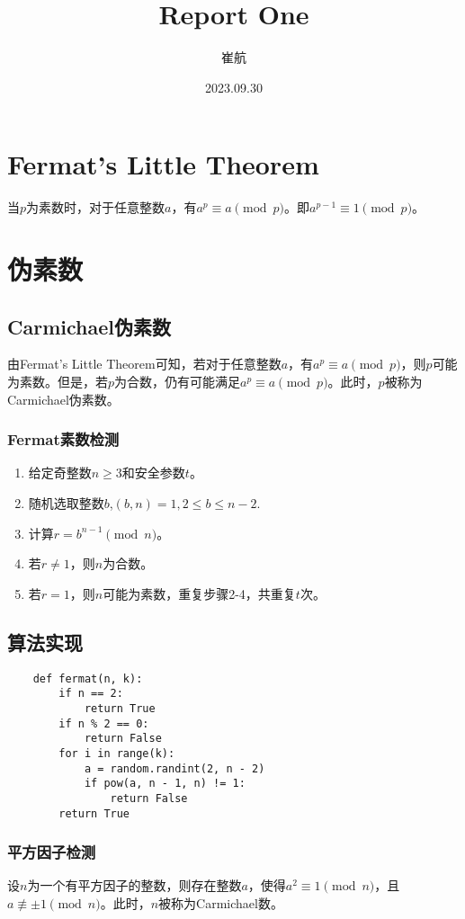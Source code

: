 \documentclass[a4paper]{article}
\title{\heiti\zihao{3} Report One}
\author{\songti 崔航}
\date{2023.09.30}
\begin{document}
    \maketitle
\begin{abstract}
    \lipsum[2]
\end{abstract}
\tableofcontents
\section{Fermat's Little Theorem}
当$p$为素数时，对于任意整数$a$，有$a^p\equiv a\pmod p$。即$a^{p-1}\equiv1\pmod p$。
\section{伪素数}
\subsection{Carmichael伪素数}
由Fermat's Little Theorem可知，若对于任意整数$a$，有$a^p\equiv a\pmod p$，则$p$可能为素数。但是，若$p$为合数，仍有可能满足$a^p\equiv a\pmod p$。此时，$p$被称为Carmichael伪素数。

\subsubsection{Fermat素数检测}
\begin{enumerate}
    \item 给定奇整数$n\geq3$和安全参数$t$。
    \item 随机选取整数$b$,$(b,n)=1,2\leq b\leq n-2$.
    \item 计算$r=b^{n-1}\pmod n$。
    \item 若$r\neq1$，则$n$为合数。
    \item 若$r=1$，则$n$可能为素数，重复步骤2-4，共重复$t$次。
\end{enumerate}
\subsection{算法实现}
\begin{verbatim}
    def fermat(n, k):
        if n == 2:
            return True
        if n % 2 == 0:
            return False
        for i in range(k):
            a = random.randint(2, n - 2)
            if pow(a, n - 1, n) != 1:
                return False
        return True
\end{verbatim}
\subsubsection{平方因子检测}
设$n$为一个有平方因子的整数，则存在整数$a$，使得$a^2\equiv1\pmod n$，且$a\not\equiv\pm1\pmod n$。此时，$n$被称为Carmichael数。
\end{document}
